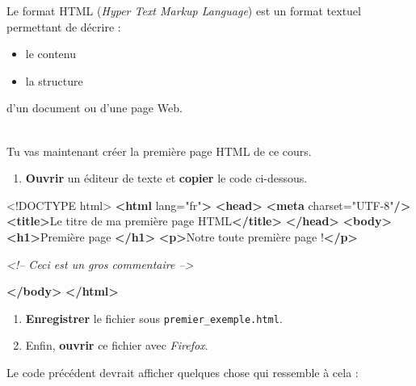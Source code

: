 \documentclass[a4paper,17pt]{extarticle}
\newenvironment{eleve}%
{\begin{activite}\color{noiramu}\\}
{\end{activite}}
\providecommand{\tightlist}{%
      \setlength{\itemsep}{0pt}\setlength{\parskip}{0pt}}
\newenvironment{Shaded}{}{}
\newcommand{\KeywordTok}[1]{\textcolor[rgb]{0.00,0.44,0.13}{\textbf{{#1}}}}
\newcommand{\DataTypeTok}[1]{\textcolor[rgb]{0.56,0.13,0.00}{{#1}}}
\newcommand{\StringTok}[1]{\textcolor[rgb]{0.25,0.44,0.63}{{#1}}}
\newcommand{\CommentTok}[1]{\textcolor[rgb]{0.38,0.63,0.69}{\textit{{#1}}}}
\newcommand{\OtherTok}[1]{\textcolor[rgb]{0.00,0.44,0.13}{{#1}}}
\newcommand{\NormalTok}[1]{{#1}}
\begin{document}
    Le format HTML (\emph{Hyper Text Markup Language}) est un format textuel
permettant de décrire :

\begin{itemize}
\tightlist
\item
  le contenu
\item
  la structure
\end{itemize}

d'un document ou d'une page Web.
\begin{eleve}
    Tu vas maintenant créer la première page HTML de ce cours.

\begin{enumerate}
\def\labelenumi{\arabic{enumi}.}
\tightlist
\item
  \textbf{Ouvrir} un éditeur de texte et \textbf{copier} le code
  ci-dessous.
\end{enumerate}

\begin{Shaded}
\begin{Highlighting}[]
\DataTypeTok{<!DOCTYPE }\NormalTok{html}\DataTypeTok{>}
\KeywordTok{<html}\OtherTok{ lang=}\StringTok{"fr"}\KeywordTok{>}
\KeywordTok{<head>}
    \KeywordTok{<meta}\OtherTok{ charset=}\StringTok{"UTF-8"}\KeywordTok{/>}
    \KeywordTok{<title>}\NormalTok{Le titre de ma première page HTML}\KeywordTok{</title>}
\KeywordTok{</head>}
\KeywordTok{<body>}
    \KeywordTok{<h1>}\NormalTok{Première page }\KeywordTok{</h1>}
    \KeywordTok{<p>}\NormalTok{Notre toute première page !}\KeywordTok{</p>}

    \CommentTok{<!-- Ceci est un gros commentaire -->}
    
\KeywordTok{</body>}
\KeywordTok{</html>}
\end{Highlighting}
\end{Shaded}

\begin{enumerate}
\def\labelenumi{\arabic{enumi}.}
\setcounter{enumi}{1}
\tightlist
\item
  \textbf{Enregistrer} le fichier sous \texttt{premier\_exemple.html}.
\item
  Enfin, \textbf{ouvrir} ce fichier avec \emph{Firefox}.
\end{enumerate}
        
        \end{eleve}\begin{reponse}
    Le code précédent devrait afficher quelques chose qui ressemble à cela :


\end{reponse}
\end{document}
